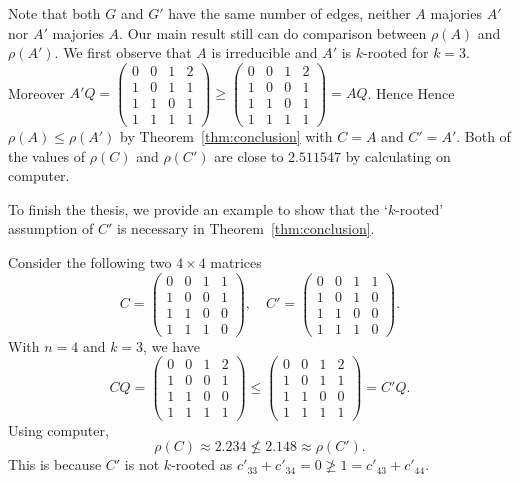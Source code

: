 \documentclass{beamer}
\begin{document}
\begin{frame}
    Note that both $G$ and $G'$ have the same number of edges, 
neither $A$ majories $A'$ nor $A'$ majories $A$. Our main result still can do comparison between 
$\rho(A)$ and $\rho(A')$. 
We first observe that $A$ is irreducible and $A'$ is $k$-rooted for $k=3$. Moreover 
$A'Q=\begin{pmatrix}
    0 & 0 & 1 & 2\\
    1 & 0 & 1 & 1\\
    1 & 1 & 0 & 1\\
    1 & 1 & 1 & 1
    \end{pmatrix}\geq \begin{pmatrix}
    0 & 0 & 1 & 2\\
    1 & 0 & 0 & 1\\
    1 & 1 & 0 & 1\\
    1 & 1 & 1 & 1
    \end{pmatrix}=AQ$. 
Hence Hence $\rho(A)\leq\rho(A')$ by Theorem~\ref{thm:conclusion} with $C=A$ and $C'=A'$. 
Both of the values of $\rho(C)$ and $\rho(C')$ are close to $2.511547$ by  calculating on computer. \cite[sage]{sage}
\end{frame}

\begin{frame}
    To finish the thesis, we provide an example to show that the `$k$-rooted' assumption of $C'$ is necessary in Theorem~\ref{thm:conclusion}. 

    Consider the following two $4\times 4$ matrices
    $$C=\begin{pmatrix}
    0 & 0 & 1 & 1\\
    1 & 0 & 0 & 1\\
    1 & 1 & 0 & 0\\
    1 & 1 & 1 & 0
    \end{pmatrix},\quad C'=\begin{pmatrix}
    0 & 0 & 1 & 1\\
    1 & 0 & 1 &  0\\
    1 & 1 & 0 & 0\\
    1 & 1 & 1 & 0
    \end{pmatrix}.$$
    With $n=4$ and $k=3$, we have  
    $$CQ=\begin{pmatrix}
    0 & 0 & 1 & 2\\
    1 & 0 & 0 & 1\\
    1 & 1 & 0 & 0\\
    1 & 1 & 1 & 1
    \end{pmatrix}\leq \begin{pmatrix}
    0 & 0 & 1 & 2\\
    1 & 0 & 1 & 1\\
    1 & 1 & 0 & 0\\
    1 & 1 & 1 & 1
    \end{pmatrix}=C'Q.$$
Using computer, \cite[sage]{sage}
    $$\rho(C)\approx 2.234\not\leq 2.148\approx \rho(C').$$
    This is because $C'$ is not $k$-rooted as $c'_{33}+c'_{34}=0\not\geq 1=c'_{43}+c'_{44}$.
\end{frame}
\end{document}
